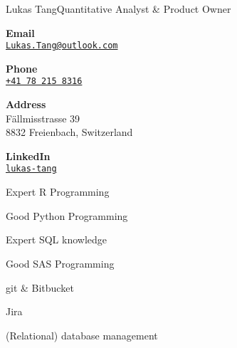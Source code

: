 \documentclass{article}
\begin{document}
\begin{cv}[avatar]{Lukas Tang}{Quantitative Analyst \& Product Owner}
\cvsidebar %



\begin{cvitem}[Envelope][4]
    \textbf{Email}\\
    \href{mailto:Lukas.Tang@outlook.com}{\texttt{Lukas.Tang@outlook.com}}
\end{cvitem}

\cvseparator[3]
\begin{cvitem}[Phone][4]
    \textbf{Phone}\\
    \href{tel:+41782158316}{\texttt{+41 78 215 8316}}
\end{cvitem}

\cvseparator[3]
\begin{cvitem}[Home][4]
    \textbf{Address}\\
    Fällmisstrasse 39\\ 8832 Freienbach, Switzerland
\end{cvitem}

\cvseparator[3]
\begin{cvitem}[Globe][4]
    \textbf{LinkedIn}\\
    \href{www.linkedin.com/in/lukas-tang}{\texttt{lukas-tang}}
\end{cvitem}



\begin{cvitem}
    Expert R Programming
\end{cvitem}
\cvseparator
\begin{cvitem}
    Good Python Programming
\end{cvitem}
\cvseparator
\begin{cvitem}
    Expert SQL knowledge
\end{cvitem}
\cvseparator
\begin{cvitem}
    Good SAS Programming
\end{cvitem}
\cvseparator
\begin{cvitem}
    git \& Bitbucket
\end{cvitem}
\cvseparator
\begin{cvitem}
    Jira
\end{cvitem}
\cvseparator
\begin{cvitem}
    (Relational) database management
\end{cvitem}


\end{cv}
\end{document}
